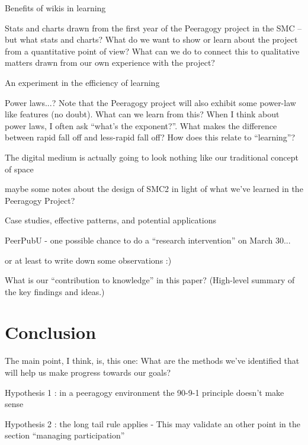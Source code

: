 \documentclass{acm_proc_article-sp}
\begin{document}
    Benefits of wikis in learning

        Stats and charts drawn from the first year of the Peeragogy project in the SMC -- but what stats and charts? What do we want to show or learn about the project from a quantitative point of view? What can we do to connect this to qualitative matters drawn from our own experience with the project?

    An experiment in the efficiency of learning

        Power laws...? Note that the Peeragogy project will also exhibit some power-law like features (no doubt). What can we learn from this? When I think about power laws, I often ask ``what's the exponent?''. What makes the difference between rapid fall off and less-rapid fall off? How does this relate to ``learning''?

    The digital medium is actually going to look nothing like our traditional concept of space

        maybe some notes about the design of SMC2 in light of what we've learned in the Peeragogy Project? 

    Case studies, effective patterns, and potential applications

        PeerPubU - one possible chance to do a ``research intervention'' on March 30...

        or at least to write down some observations :)

        What is our ``contribution to knowledge'' in this paper? (High-level summary of the key findings and ideas.)\cite{paragogy}
\cite{Origins}
\cite{Tales}
\cite{Peeragogy-2}
\cite{College}
\cite{Bridges}
\cite{peer}
\cite{Gluing}
\cite{GroupInformatics}
\cite{Why}
\cite{PeeragogyinAction}

%
%
%
%

\section{Conclusion}

    The main point, I think, is, this one: What are the methods we've identified that will help us make progress towards our goals?

                Hypothesis 1 : in a peeragogy environment the 90-9-1 principle doesn't make sense

                Hypothesis 2 : the long tail rule applies - This may validate an other point in the section ``managing participation''
\end{document}
